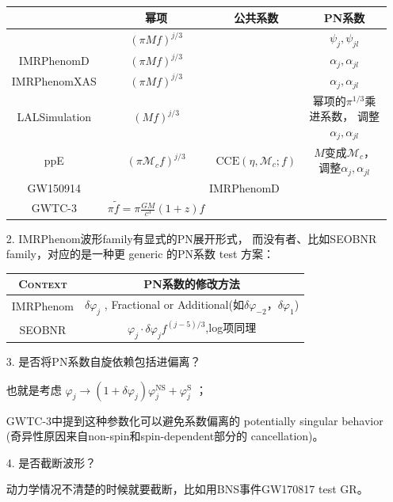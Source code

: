 \documentclass[CJK,aspectratio=169]{beamer}  %
\begin{document}
\begin{frame}[allowframebreaks]
\begin{itemize}
		\begin{table}[h!]
			\begin{center}
				\begin{tabular}{|c|c|c|c|}
					\hline
					\diagbox{} & 幂项 & 公共系数 & PN系数 \\
					\hline
					\cite{reexpress_pn_3} & $(\pi Mf)^{j/3}$ & & $\psi_j,\psi_{jl}$ \\
					\hline
					IMRPhenomD & $(\pi Mf)^{j/3}$ & & $\alpha_j,\alpha_{jl}$\\
					\hline
					IMRPhenomXAS & $(\pi Mf)^{j/3}$ & & $\alpha_j,\alpha_{jl}$\\
					\hline
					LALSimulation & $(Mf)^{j/3}$ & & \makecell{幂项的$\pi^{1/3}$乘进系数，\\ 调整$\alpha_j,\alpha_{jl}$} \\
					\hline
					ppE\cite{ppE} & $(\pi\mathcal{M}_c f)^{j/3}$ & $\text{CCE}(\eta,\mathcal{M}_c;f)$ & \makecell{$M$变成$\mathcal{M}_c$，\\ 调整$\alpha_j,\alpha_{jl}$} \\
					\hline
					GW150914 \cite{test_GR_GW150914} & \multicolumn{3}{|c|}{IMRPhenomD} \\
					\hline
					GWTC-3 \cite{test_GR_GWTC3} & $\pi \tilde{f} = \pi \frac{GM}{c^3}(1+z)f$ & & \\
					\hline
				\end{tabular}
			\end{center}
		\end{table}
		\item[2. ] IMRPhenom波形family有显式的PN展开形式，
				而没有者、比如SEOBNR family，对应的是一种更 generic 的PN系数 test 方案：
		\begin{table}[h!]
			\begin{center}
				\begin{tabular}{|c|c|}
					\hline
					\textsc{Context} & PN系数的修改方法 \\
					\hline
					IMRPhenom & $\delta\varphi_j$  , Fractional or Additional(如$\delta\varphi_{-2}$，$\delta\varphi_1$) \\
					\hline
					SEOBNR & $\varphi_j \cdot \delta\varphi_j f^{(j-5)/3}$,log项同理\cite{test_GR_GW170817}\\
					\hline
				\end{tabular}
			\end{center}
		\end{table}
		\item[3. ] 是否将PN系数自旋依赖包括进偏离？
			\par 也就是考虑 $\varphi_j \longrightarrow (1 + \delta\varphi_j)\varphi_j^\text{NS} + \varphi_j^\text{S}$ \cite{test_GR_BBH_O1}；
			\par GWTC-3\cite{test_GR_GWTC3}中提到这种参数化可以避免系数偏离的 potentially singular behavior (奇异性原因来自non-spin和spin-dependent部分的 cancellation)。
		\item[4. ] 是否截断波形？
			\par 动力学情况不清楚的时候就要截断，比如用BNS事件GW170817 test GR\cite{test_GR_GW170817}。
	\end{itemize}
\end{frame}
\end{document}
